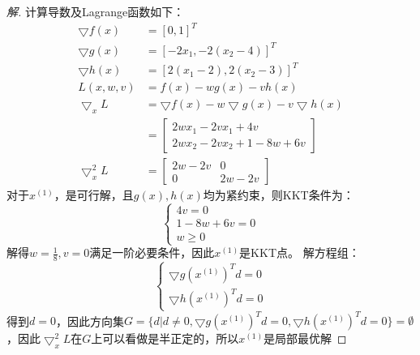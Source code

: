 \documentclass[a4paper]{article}
\begin{document}
\begin{proof}[解]
	计算导数及Lagrange函数如下：
	\begin{equation}
	\begin{aligned}
	\bigtriangledown f(x)&=[0,1]^T \\
	\bigtriangledown g(x)&=[-2x_1,-2(x_2-4)]^T \\
	\bigtriangledown h(x)&=[2(x_1-2),2(x_2-3)]^T \\
	L(x,w,v)&=f(x)-wg(x)-vh(x) \\
	\bigtriangledown_x L&=\bigtriangledown f(x)-w\bigtriangledown g(x)-v\bigtriangledown h(x) \\
	&=\left[
	\begin{array}{c}
	2wx_1-2vx_1+4v \\
	2wx_2-2vx_2+1-8w+6v
	\end{array}
	\right]\\
	\bigtriangledown_x^2 L&= \left[
	\begin{array}{cc}
	2w-2v & 0\\
	0 & 2w-2v
	\end{array}
	\right]
	\end{aligned}
	\end{equation}
	对于$x^{(1)}$，是可行解，且$g(x),h(x)$均为紧约束，则KKT条件为：
	\begin{equation}
	\left\{
	\begin{array}{c}
	4v=0 \\
	1-8w+6v=0 \\
	w\ge 0
	\end{array}
	\right.
	\end{equation}
	解得$w=\frac{1}{8},v=0$满足一阶必要条件，因此$x^{(1)}$是KKT点。
	解方程组：
	\begin{equation}
	\left\{
	\begin{array}{c}
	\bigtriangledown g(x^{(1)})^Td=0 \\
	\bigtriangledown h(x^{(1)})^Td=0
	\end{array}
	\right.
	\end{equation}
	得到$d=0$，因此方向集$G=\{d|d\neq0,\bigtriangledown g(x^{(1)})^Td=0,\bigtriangledown h(x^{(1)})^Td=0\}=\emptyset$，因此$\bigtriangledown_x^2 L$在$G$上可以看做是半正定的，所以$x^{(1)}$是局部最优解
	

\end{proof}
\end{document}
